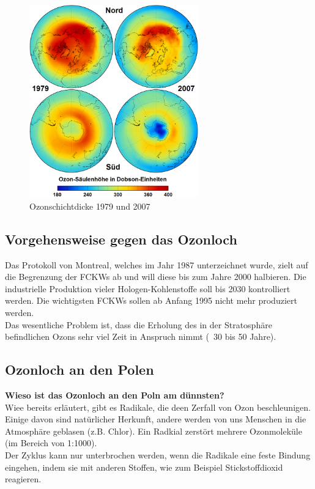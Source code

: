 \documentclass[11pt, a4paper]{article}
\begin{document}
\begin{figure}[h!]
	\centering
	\includegraphics[width=0.65\textwidth]{images/ozondichte}
	\caption{Ozonschichtdicke 1979 und 2007}
\end{figure}

\newpage
\subsection{Vorgehensweise gegen das Ozonloch}
Das Protokoll von Montreal, welches im Jahr 1987 unterzeichnet wurde, zielt auf die Begrenzung der FCKWs ab und will diese bis zum Jahre 2000 halbieren. Die industrielle Produktion vieler Hologen-Kohlenstoffe soll bis 2030 kontrolliert werden. Die wichtigsten FCKWs sollen ab Anfang 1995 nicht mehr produziert werden. \\
Das wesentliche Problem ist, dass die Erholung des in der Stratosphäre befindlichen Ozons sehr viel Zeit in Anspruch nimmt (~30 bis 50 Jahre).
\subsection{Ozonloch an den Polen}
\textbf{Wieso ist das Ozonloch an den Poln am dünnsten?}\\
Wiee bereits erläutert, gibt es Radikale, die deen Zerfall von Ozon beschleunigen. \\Einige davon sind natürlicher Herkunft, andere werden von uns Menschen in die Atmosphäre geblasen (z.B. Chlor). Ein Radkial zerstört mehrere Ozonmoleküle (im Bereich von 1:1000). \\Der Zyklus kann nur unterbrochen werden, wenn die Radikale eine feste Bindung eingehen, indem sie mit anderen Stoffen, wie zum Beispiel Stickstoffdioxid reagieren.
\end{document}
